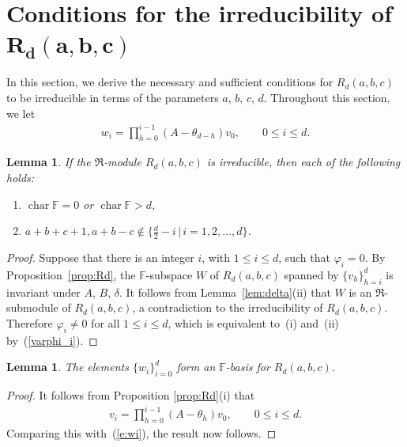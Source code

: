 \documentclass[pdftex]{sigma}
\def\F{\mathbb F}
\numberwithin{equation}{section}
\newtheorem{Lemma}[Theorem]{Lemma}
\begin{document}
\section[Conditions for the irreducibility of $R_d(a,b,c)$]{Conditions for the irreducibility of $\boldsymbol{R_d(a,b,c)}$}\label{s:irr}

In this section, we derive the necessary and sufficient conditions for $R_d(a,b,c)$ to be irreducible in terms of the parameters $a$, $b$, $c$, $d$. Throughout this section, we let
\begin{gather}\label{e:wi}
w_i=\prod_{h=0}^{i-1} (A-\theta_{d-h}) v_0, \qquad 0\leq i\leq d.
\end{gather}

\begin{Lemma}\label{lem:irr1}If the $\Re$-module $R_d(a,b,c)$ is irreducible, then each of the following holds:
\begin{enumerate}\itemsep=0pt
\item[$(i)$] $\operatorname{char} \F=0$ or $\operatorname{char} \F>d$,
\item[$(ii)$] $a+b+c+1, a+b-c\not\in \big\{{\frac{d}{2}-i}\,\big|\,i=1,2,\ldots,d\big\}$.
\end{enumerate}
\end{Lemma}
\begin{proof} Suppose that there is an integer $i$, with $1\leq i\leq d$, such that $\varphi_i=0$. By Proposition~\ref{prop:Rd}, the $\F$-subspace $W$ of $R_d(a,b,c)$ spanned by $\{v_h\}_{h=i}^d$ is invariant under $A$, $B$, $\delta$. It follows from Lemma~\ref{lem:delta}(ii) that $W$ is an $\Re$-submodule of $R_d(a,b,c)$, a contradiction to the irreducibility of $R_d(a,b,c)$. Therefore $\varphi_i\not=0$ for all $1\leq i\leq d$, which is equivalent to~(i) and~(ii) by~(\ref{varphi_i}).
\end{proof}

\begin{Lemma}\label{lem:iso2} The elements $\{w_i\}_{i=0}^d$ form an $\F$-basis for $R_d(a,b,c)$.
\end{Lemma}
\begin{proof} It follows from Proposition \ref{prop:Rd}(i) that
\begin{gather*}
v_i=\prod_{h=0}^{i-1} (A-\theta_{h}) v_0, \qquad 0\leq i\leq d.
\end{gather*}
Comparing this with~(\ref{e:wi}), the result now follows.
\end{proof}
\end{document}
